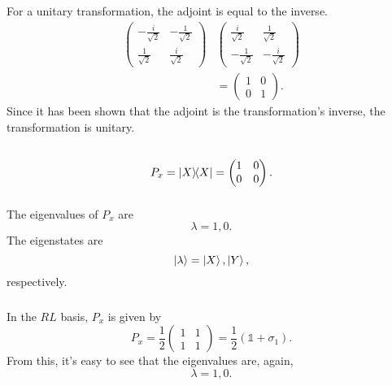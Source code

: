 \documentclass[a4paper,12pt,twoside]{article}
\begin{document}
\subsubsection{}
For a unitary transformation, the adjoint is equal to the inverse.
\begin{align}
	\begin{pmatrix}
		-\frac{i}{\sqrt{2}} & -\frac{1}{\sqrt{2}} \\
		\frac{1}{\sqrt{2}} & \frac{i}{\sqrt{2}}
	\end{pmatrix}&
	\begin{pmatrix}
		\frac{i}{\sqrt{2}} & \frac{1}{\sqrt{2}} \\
		-\frac{1}{\sqrt{2}} & -\frac{i}{\sqrt{2}}
	\end{pmatrix}\nonumber\\
	&= \begin{pmatrix}
		1 & 0 \\
		0 & 1
	\end{pmatrix}.
\end{align}
Since it has been shown that the adjoint is the transformation's inverse, the transformation is unitary.
\subsection{}%
\subsubsection{}
\begin{equation}
	P_x = \op{X} = \begin{pmatrix}
		1 & 0 \\
		0 & 0
	\end{pmatrix}.
\end{equation}
\subsubsection{}
The eigenvalues of $P_x$ are
\begin{equation}
	\lambda = 1,0.
\end{equation}
The eigenstates are
\begin{equation}
	\ket{\lambda} = \ket{X},\ket{Y},
\end{equation}
respectively.
\subsubsection{}
In the $RL$ basis, $P_x$ is given by
\begin{equation}
	P_x = \frac{1}{2} \begin{pmatrix}
		1 & 1 \\ 1 & 1
	\end{pmatrix} = \frac{1}{2}(\mathbb{1}+\sigma_1).
\end{equation}
From this, it's easy to see that the eigenvalues are, again,
\begin{equation}
	\lambda = 1,0.
\end{equation}
\end{document}
